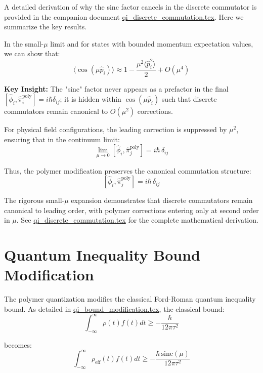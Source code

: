 \documentclass[12pt]{article}
\begin{document}
A detailed derivation of why the sinc factor cancels in the discrete commutator is provided in the companion document \href{file:qi_discrete_commutation.tex}{qi\_discrete\_commutation.tex}. Here we summarize the key results.

In the small-$\mu$ limit and for states with bounded momentum expectation values, we can show that:
\begin{equation}
\langle \cos(\mu \hat{p}_i) \rangle \approx 1 - \frac{\mu^2 \langle \hat{p}_i^2 \rangle}{2} + O(\mu^4)
\end{equation}

\textbf{Key Insight:} The "sinc" factor never appears as a prefactor in the final $[\hat{\phi}_i, \hat{\pi}_i^{\text{poly}}] = i\hbar\delta_{ij}$; it is hidden within $\cos(\mu \hat{p}_i)$ such that discrete commutators remain canonical to $O(\mu^2)$ corrections.

For physical field configurations, the leading correction is suppressed by $\mu^2$, ensuring that in the continuum limit:
\begin{equation}
\lim_{\mu \to 0} [\hat{\phi}_i, \hat{\pi}_j^{\text{poly}}] = i\hbar\,\delta_{ij}
\end{equation}

Thus, the polymer modification preserves the canonical commutation structure:
\begin{equation}
\boxed{[\hat{\phi}_i, \hat{\pi}_j^{\text{poly}}] = i\hbar\,\delta_{ij}}
\end{equation}

The rigorous small-$\mu$ expansion demonstrates that discrete commutators remain canonical to leading order, with polymer corrections entering only at second order in $\mu$. See \href{file:qi_discrete_commutation.tex}{qi\_discrete\_commutation.tex} for the complete mathematical derivation.

\section{Quantum Inequality Bound Modification}

The polymer quantization modifies the classical Ford-Roman quantum inequality bound. As detailed in \href{file:qi_bound_modification.tex}{qi\_bound\_modification.tex}, the classical bound:
\begin{equation}
\int_{-\infty}^{\infty} \rho(t) f(t) dt \geq -\frac{\hbar}{12\pi\tau^2}
\end{equation}

becomes:
\begin{equation}
\int_{-\infty}^{\infty} \rho_{\text{eff}}(t) f(t) dt \geq -\frac{\hbar\,\mathrm{sinc}(\mu)}{12\pi\tau^2}
\end{equation}
\end{document}
